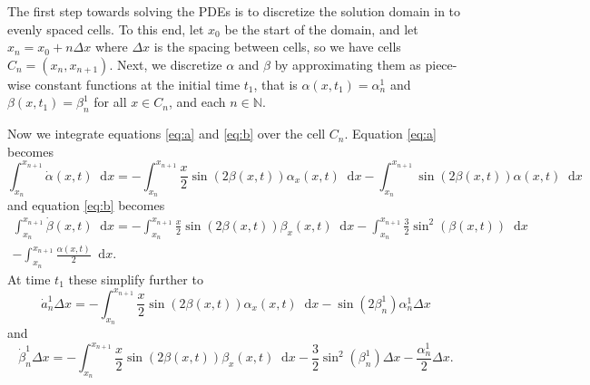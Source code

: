 \documentclass[12pt]{article}
\newcommand{\dd}{\mathop{}\!\mathrm{d}}
\begin{document}
The first step towards solving the PDEs is to discretize the solution domain in to
evenly spaced cells. To this end, let $x_0$ be the start of the domain, and let $x_n =
x_0 + n\Delta x$ where $\Delta x$ is the spacing between cells, so we have cells $C_n =
(x_n,x_{n+1})$. Next, we discretize $\alpha$ and $\beta$ by approximating them as
piece-wise constant functions at the initial time $t_1$, that is $\alpha(x,t_1) =
\alpha_n^1$ and $\beta(x,t_1) = \beta_n^1$ for all $x \in C_n$, and each
$n\in\mathbb{N}$.

Now we integrate equations \ref{eq:a} and \ref{eq:b} over the cell $C_n$.
Equation \ref{eq:a} becomes
\[
    \int_{x_n}^{x_{n+1}}\! \dot{\alpha}(x, t) \dd x = - \int_{x_n}^{x_{n+1}}\!
    \frac{x}{2} \sin(2\beta(x, t)) \alpha_x(x, t) \dd x - \int_{x_n}^{x_{n+1}}\!
    \sin(2\beta(x, t)) \alpha(x, t) \dd x
\]
and equation \ref{eq:b} becomes
\begin{multline*}
    \int_{x_n}^{x_{n+1}}\! \dot{\beta}(x, t) \dd x = - \int_{x_n}^{x_{n+1}}\!
    \frac{x}{2} \sin(2\beta(x, t)) \beta_x(x, t) \dd x - \int_{x_n}^{x_{n+1}}\!
    \frac{3}{2} \sin^2(\beta(x, t)) \dd x \\ - \int_{x_n}^{x_{n+1}}\! \frac{\alpha(x,
    t)}{2} \dd x.
\end{multline*}
At time $t_1$ these simplify further to
\begin{equation} \label{eq:a2}
    \dot{a}_n^1 \Delta x = - \int_{x_n}^{x_{n+1}}\! \frac{x}{2} \sin(2\beta(x, t))
    \alpha_x(x, t) \dd x - \sin(2\beta_n^1) \alpha_n^1 \Delta x
\end{equation}
and
\begin{equation} \label{eq:b2}
    \dot{\beta}_n^1 \Delta x = - \int_{x_n}^{x_{n+1}}\! \frac{x}{2} \sin(2\beta(x, t))
    \beta_x(x, t) \dd x - \frac{3}{2} \sin^2(\beta_n^1) \Delta x - \frac{\alpha_n^1}{2}
    \Delta x.
\end{equation}

\printbibliography[heading=bibintoc]
\end{document}
